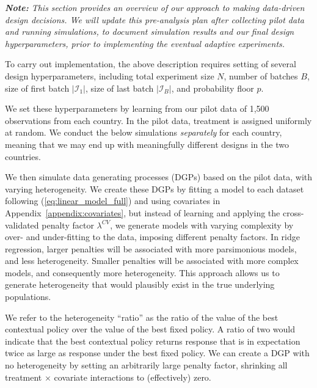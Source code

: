 \documentclass[letterpaper, 12pt, parskip=full,]{scrartcl}
\begin{document}
\textit{\textbf{Note:} This section provides an overview of our approach to making data-driven design decisions. We will update this pre-analysis plan \textit{after} collecting pilot data and running simulations, to document simulation results and our final design hyperparameters, prior to implementing the eventual adaptive experiments. }

To carry out implementation, the above description requires setting of several design hyperparameters, including total experiment size $N$, number of batches $B$,  size of first batch $|\mathcal{I}_1|$, size of last batch $|\mathcal{I}_B|$, and probability floor $p$. 

We set these hyperparameters by learning from our pilot data of 1,500 observations from each country. In the pilot data, treatment is assigned uniformly at random. We conduct the below simulations \textit{separately} for each country, meaning that we may end up with meaningfully different designs in the two countries. 

We then simulate data generating processes (DGPs) based on the pilot data, with varying heterogeneity. We create these DGPs by fitting a model to each dataset following (\ref{eq:linear_model_full}) and using covariates in Appendix~\ref{appendix:covariates}, but instead of learning and applying the cross-validated penalty factor $\lambda^{CV}$, we generate models with varying complexity by over- and under-fitting to the data, imposing different penalty factors. In ridge regression, larger penalties will be associated with more parsimonious models, and less heterogeneity. Smaller penalties will be associated with more complex models, and consequently more heterogeneity. This approach allows us to generate heterogeneity that would plausibly exist in the true underlying populations. 

We refer to the heterogeneity ``ratio'' as the ratio of the value of the best contextual policy over the value of the best fixed policy. A ratio of two would indicate that the best contextual policy returns response that is in expectation twice as large as response under the best fixed policy. We can create a DGP with no heterogeneity by setting an arbitrarily large penalty factor, shrinking all treatment $\times$ covariate interactions to (effectively) zero. 
\end{document}
